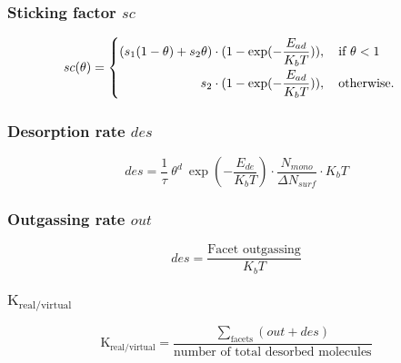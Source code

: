 \subsubsection*{Sticking factor $sc$}
\begin{equation}
	sc(\theta)=
	\begin{cases}
		\begin{split}
		(s_1 (1-\theta) + s_2 \theta) \cdot (1 -  \exp({-\frac{E_{ad}}{K_b T}}))&, \text{\quad if}\ \theta < 1\\
		s_2  \cdot (1 -  \exp({-\frac{E_{ad}}{K_b T}}))&,  \text{\quad otherwise}.
		\end{split}
	\end{cases}
\end{equation}

\subsubsection*{Desorption rate $des$}
\begin{equation}
	des=\frac{1}{\tau}\ \theta^d\ \exp({-\frac{E_{de}}{K_b T}})\cdot \frac{N_{mono}}{\Delta N_{surf}} \cdot K_b T
\end{equation}

\subsubsection*{Outgassing rate $out$}
\begin{equation}
	des=\frac{\text{Facet outgassing}}{K_b T}
\end{equation}

\subsubsection*{$\text{K}_{\text{real}/\text{virtual}}$}
\begin{equation}
\text{K}_{\text{real}/\text{virtual}}=\frac{\sum\limits_{\text{facets}}(out + des)}{\text{number of total desorbed molecules}}
\end{equation}



